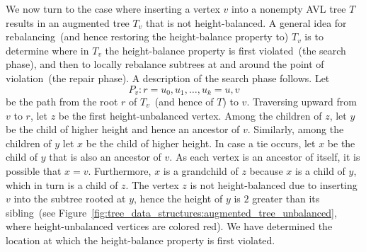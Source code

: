 We now turn to the case where inserting a vertex $v$ into a nonempty
AVL tree $T$ results in an augmented tree $T_v$ that is not
height-balanced. A general idea for rebalancing~(and hence restoring
the height-balance property to) $T_v$ is to determine where in $T_v$
the height-balance property is first violated~(the search phase), and
then to locally rebalance subtrees at and around the point of
violation~(the repair phase). A description of the search phase
follows. Let
\[
P_v: r = u_0, u_1, \dots, u_k = u, v
\]
be the path from the root $r$ of $T_v$~(and hence of $T$) to
$v$. Traversing upward from $v$ to $r$, let $z$ be the first
height-unbalanced vertex. Among the children of $z$, let $y$ be the
child of higher height and hence an ancestor of $v$. Similarly, among
the children of $y$ let $x$ be the child of higher height. In case a
tie occurs, let $x$ be the child of $y$ that is also an ancestor of
$v$. As each vertex is an ancestor of itself, it is possible that
$x = v$. Furthermore, $x$ is a grandchild of $z$ because $x$ is a
child of $y$, which in turn is a child of $z$. The vertex $z$ is not
height-balanced due to inserting $v$ into the subtree rooted at $y$,
hence the height of $y$ is $2$ greater than its sibling~(see
Figure~\ref{fig:tree_data_structures:augmented_tree_unbalanced}, where
height-unbalanced vertices are colored red). We
have determined the location at which the height-balance property is
first violated.

